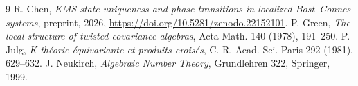 \documentclass[11pt]{amsart}
\theoremstyle{remark}
\begin{document}
\begin{thebibliography}{9}
 R. Chen, \emph{KMS state uniqueness and phase transitions in localized Bost--Connes systems}, preprint, 2026, \newline\url{https://doi.org/10.5281/zenodo.22152101}.
 P. Green, \emph{The local structure of twisted covariance algebras}, Acta Math. 140 (1978), 191--250.
 P. Julg, \emph{K-th\'eorie \'equivariante et produits crois\'es}, C. R. Acad. Sci. Paris 292 (1981), 629--632.
 J. Neukirch, \emph{Algebraic Number Theory}, Grundlehren 322, Springer, 1999.
\end{thebibliography}
\end{document}

